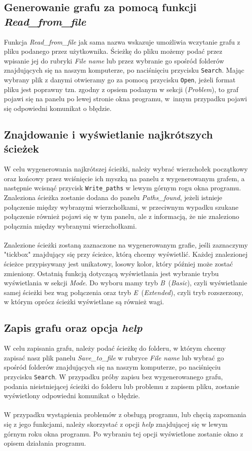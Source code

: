 \documentclass[12pt, a4paper]{article}
\begin{document}
\subsection{Generowanie grafu za pomocą funkcji \textit{Read\_from\_file}}
Funkcja \textit{Read\_from\_file} jak sama nazwa wskazuje umożliwia wczytanie grafu z pliku podanego przez użytkownika. Ścieżkę do pliku możemy podać przez wpisanie jej do rubryki \textit{File name} lub przez wybranie go spośród folderów znajdujących się na naszym komputerze, po naciśnięciu przycisku \texttt{Search}. Mając wybrany plik z danymi otwieramy go za pomocą przycisku \texttt{Open}, jeżeli format pliku jest poprawny tzn. zgodny z opsiem podanym w sekcji (\textit{Problem}), to graf pojawi się na panelu po lewej stronie okna programu, w~innym przypadku pojawi się odpowiedni komunikat o błędzie.

\subsection{Znajdowanie i wyświetlanie najkrótszych ścieżek}
W celu wygenerowania najkrótszej ścieżki, należy wybrać wierzchołek początkowy oraz końcowy przez wciśnięcie ich myszką na panelu z wygenerowanym grafem, a następnie wcisnąć przycisk \texttt{Write\_paths} w lewym górnym rogu okna programu. Znaleziona ścieżka zostanie dodana do panelu \textit{Paths\_found}, jeżeli istnieje połączenie między wybranymi wierzchołkami, w przeciwnym wypadku szukane połączenie również pojawi się w tym panelu, ale z informacją, że nie znaleziono połącznia między wybranymi wierzchołkami.\\\\
Znalezione ścieżki zostaną zaznaczone na wygenerowanym grafie, jeśli zaznaczymy "tickbox" znajdujący się przy ścieżce, którą chcemy wyświetlić. Każdej znalezionej ścieżce przypisywany jest unikatowy, losowy kolor, który później może zostać zmieniony. Ostatnią funkcją dotyczącą wyświetlania jest wybranie trybu wyświetlania w sekcji \textit{Mode}. Do wyboru mamy tryb \textit{B}~(\textit{Basic}), czyli wyświetlanie samej ścieżki bez wag połączenia oraz tryb \textit{E}~(\textit{Extended}), czyli tryb rozszerzony, w którym oprócz ścieżki wyświetlane są również wagi.

\subsection{Zapis grafu oraz opcja \textit{help}}
W celu zapisania grafu, należy podać ścieżkę do folderu, w którym chcemy zapisać nasz plik panelu \textit{Save\_to\_file} w rubryce \textit{File name} lub wybrać go spośród folderów znajdujących się na naszym komputerze, po naciśnięciu przycisku \texttt{Search}. W przypadku próby zapisu bez wygenerowanego grafu, podania nieistniejącej ścieżki do folderu lub problemu z zapisem pliku, zostanie wyświetlony odpowiedni komunikat o błędzie.\\\\
W przypadku wystąpienia problemów z obsługą programu, lub chęcią zapoznania się z jego funkcjami, należy skorzystać z opcji \textit{help} znajdującej się w lewym górnym roku okna programu. Po wybraniu tej opcji wyświetlone zostanie okno z opisem działania programu.\\
\end{document}
